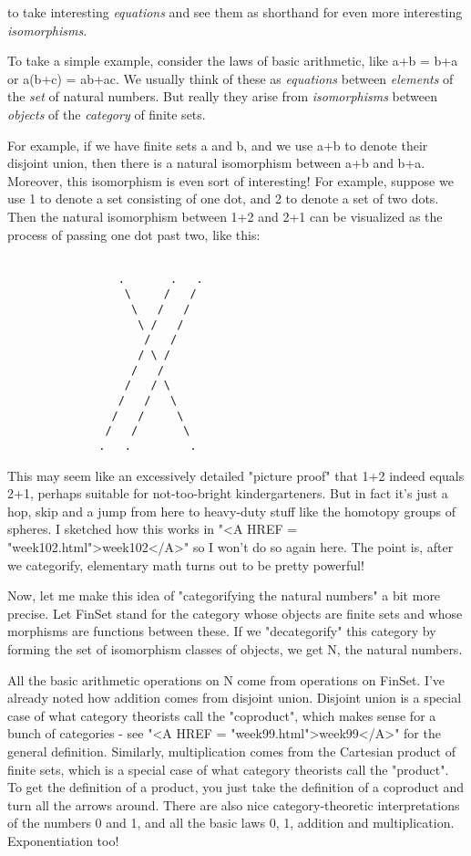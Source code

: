 to take interesting \emph{equations} and see them as shorthand for even
more interesting \emph{isomorphisms}.    

To take a simple example, consider the laws of basic arithmetic, like
a+b = b+a or a(b+c) = ab+ac.  We usually think of these as
\emph{equations} between \emph{elements} of the \emph{set} of
natural numbers.  But really they arise from \emph{isomorphisms}
between \emph{objects} of the \emph{category} of finite sets.

For example, if we have finite sets a and b, and we use a+b to 
denote their disjoint union, then there is a natural isomorphism 
between a+b and b+a.   Moreover, this isomorphism is even sort of 
interesting!  For example, suppose we use 1 to denote a set consisting 
of one dot, and 2 to denote a set of two dots.  Then the natural 
isomorphism between 1+2 and 2+1 can be visualized as the process 
of passing one dot past two, like this:


\begin{verbatim}

                 .       .   .
                  \     /   /
                   \   /   /
                    \ /   /
                     /   /
                    / \ /
                   /   /
                  /   / \
                 /   /   \
                /   /     \
               /   /       \
              .   .         .

\end{verbatim}
    
This may seem like an excessively detailed "picture proof"
that 1+2 indeed equals 2+1, perhaps suitable for not-too-bright
kindergarteners.  But in fact it's just a hop, skip and a jump from here
to heavy-duty stuff like the homotopy groups of spheres.  I sketched how
this works in "<A HREF = "week102.html">week102</A>" so I
won't do so again here.  The point is, after we categorify, elementary
math turns out to be pretty powerful!

Now, let me make this idea of "categorifying the natural numbers"
a bit more precise.  Let FinSet stand for the category whose objects
are finite sets and whose morphisms are functions between these.
If we "decategorify" this category by forming the set of isomorphism
classes of objects, we get N, the natural numbers.  

All the basic arithmetic operations on N come from operations on FinSet.
I've already noted how addition comes from disjoint union.  Disjoint
union is a special case of what category theorists call the
"coproduct", which makes sense for a bunch of categories - see
"<A HREF = "week99.html">week99</A>" for the general
definition.  Similarly, multiplication comes from the Cartesian product
of finite sets, which is a special case of what category theorists call
the "product".  To get the definition of a product, you just
take the definition of a coproduct and turn all the arrows around.
There are also nice category-theoretic interpretations of the numbers 0 and 
1, and all the basic laws 0, 1, addition and multiplication.  Exponentiation 
too! 

